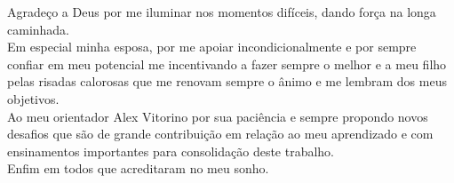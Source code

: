 \begin{agradecimentos}
Agradeço a Deus por me iluminar nos momentos difíceis, dando força na longa caminhada.\\
Em especial minha esposa, por me apoiar incondicionalmente e por sempre confiar em meu potencial me incentivando a fazer sempre o melhor e a meu filho pelas risadas calorosas que me renovam sempre o ânimo e me lembram dos meus objetivos.\\
Ao meu orientador Alex Vitorino por sua paciência e sempre propondo novos desafios que são de grande contribuição em relação ao meu aprendizado e com ensinamentos importantes para consolidação deste trabalho.\\
Enfim em todos que acreditaram no meu sonho.
\end{agradecimentos}
